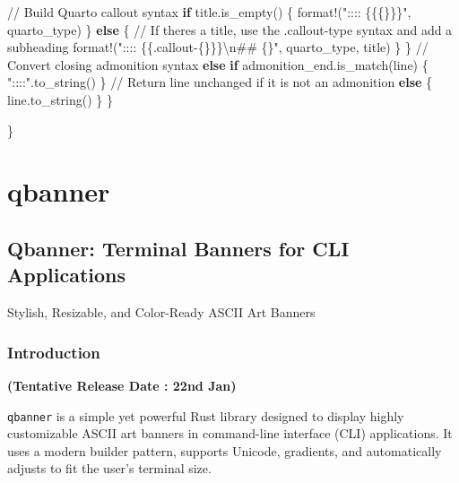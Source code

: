 \documentclass[
  letterpaper,
  DIV=11,
  numbers=noendperiod]{scrreprt}
\newenvironment{Shaded}{\begin{snugshade}}{\end{snugshade}}
\newcommand{\CommentTok}[1]{\textcolor[rgb]{0.37,0.37,0.37}{#1}}
\newcommand{\ControlFlowTok}[1]{\textcolor[rgb]{0.00,0.23,0.31}{\textbf{#1}}}
\newcommand{\NormalTok}[1]{\textcolor[rgb]{0.00,0.23,0.31}{#1}}
\newcommand{\OperatorTok}[1]{\textcolor[rgb]{0.37,0.37,0.37}{#1}}
\newcommand{\PreprocessorTok}[1]{\textcolor[rgb]{0.68,0.00,0.00}{#1}}
\newcommand{\SpecialCharTok}[1]{\textcolor[rgb]{0.37,0.37,0.37}{#1}}
\newcommand{\StringTok}[1]{\textcolor[rgb]{0.13,0.47,0.30}{#1}}
\begin{document}
\begin{Shaded}
\begin{Highlighting}[]
        \CommentTok{// Build Quarto callout syntax}
        \ControlFlowTok{if}\NormalTok{ title}\OperatorTok{.}\NormalTok{is\_empty() }\OperatorTok{\{}
            \PreprocessorTok{format!}\NormalTok{(}\StringTok{":::: \{\{\{\}\}\}"}\OperatorTok{,}\NormalTok{ quarto\_type)}
        \OperatorTok{\}} \ControlFlowTok{else} \OperatorTok{\{}
            \CommentTok{// If there\textquotesingle{}s a title, use the .callout{-}type syntax and add a subheading}
            \PreprocessorTok{format!}\NormalTok{(}\StringTok{":::: \{\{.callout{-}\{\}\}\}}\SpecialCharTok{\textbackslash{}n}\StringTok{\#\# \{\}"}\OperatorTok{,}\NormalTok{ quarto\_type}\OperatorTok{,}\NormalTok{ title)}
        \OperatorTok{\}}
     \OperatorTok{\}}
    \CommentTok{// Convert closing admonition syntax}
    \ControlFlowTok{else} \ControlFlowTok{if}\NormalTok{ admonition\_end}\OperatorTok{.}\NormalTok{is\_match(line) }\OperatorTok{\{}
        \StringTok{"::::"}\OperatorTok{.}\NormalTok{to\_string()}
    \OperatorTok{\}}
    \CommentTok{// Return line unchanged if it is not an admonition}
    \ControlFlowTok{else} \OperatorTok{\{}
\NormalTok{        line}\OperatorTok{.}\NormalTok{to\_string()}
    \OperatorTok{\}}
  \OperatorTok{\}}

\OperatorTok{\}} 
\end{Highlighting}
\end{Shaded}

\part{qbanner}

\chapter{Qbanner: Terminal Banners for CLI
Applications}\label{qbanner-terminal-banners-for-cli-applications}

Stylish, Resizable, and Color-Ready ASCII Art Banners

\hfill\break

\section{Introduction}\label{introduction-2}

\textbf{(Tentative Release Date : 22nd Jan)}

\texttt{qbanner} is a simple yet powerful Rust library designed to
display highly customizable ASCII art banners in command-line interface
(CLI) applications. It uses a modern builder pattern, supports Unicode,
gradients, and automatically adjusts to fit the user's terminal size.
\end{document}
